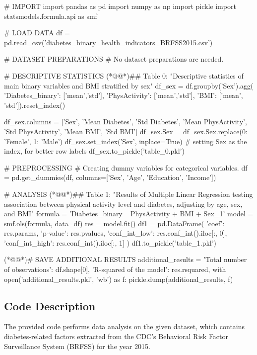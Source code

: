 \documentclass[11pt]{article}
\begin{document}
\begin{python}

# IMPORT
import pandas as pd
import numpy as np
import pickle
import statsmodels.formula.api as smf

# LOAD DATA
df = pd.read_csv('diabetes_binary_health_indicators_BRFSS2015.csv')

# DATASET PREPARATIONS
# No dataset preparations are needed.

# DESCRIPTIVE STATISTICS
(*@@*)## Table 0: "Descriptive statistics of main binary variables and BMI stratified by sex"
df_sex = df.groupby('Sex').agg(
{'Diabetes_binary': ['mean','std'],
'PhysActivity': ['mean','std'],
'BMI': ['mean', 'std']}).reset_index()

df_sex.columns = ['Sex', 'Mean Diabetes', 'Std Diabetes', 'Mean PhysActivity', 'Std PhysActivity', 'Mean BMI', 'Std BMI']
df_sex.Sex = df_sex.Sex.replace({0: 'Female', 1: 'Male'})
df_sex.set_index('Sex', inplace=True)  # setting Sex as the index, for better row labels
df_sex.to_pickle('table_0.pkl')

# PREPROCESSING 
# Creating dummy variables for categorical variables.
df = pd.get_dummies(df, columns=['Sex', 'Age', 'Education', 'Income'])

# ANALYSIS
(*@@*)## Table 1: "Results of Multiple Linear Regression testing association between physical activity level and diabetes, adjusting by age, sex, and BMI"
formula = 'Diabetes_binary ~ PhysActivity + BMI + Sex_1'
model = smf.ols(formula, data=df)
res = model.fit()
df1 = pd.DataFrame({
'coef': res.params, 
'p-value': res.pvalues, 
'conf_int_low': res.conf_int().iloc[:, 0],
'conf_int_high': res.conf_int().iloc[:, 1]
})
df1.to_pickle('table_1.pkl')

(*@@*)# SAVE ADDITIONAL RESULTS
additional_results = {
'Total number of observations': df.shape[0],
'R-squared of the model': res.rsquared,
}
with open('additional_results.pkl', 'wb') as f:
    pickle.dump(additional_results, f)


\end{python}

\subsection{Code Description}

The provided code performs data analysis on the given dataset, which contains diabetes-related factors extracted from the CDC's Behavioral Risk Factor Surveillance System (BRFSS) for the year 2015.
\end{document}
